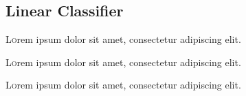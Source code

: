 \subsection{Linear Classifier}

\lettrine[nindent=0em,lines=3]{L} orem ipsum dolor sit amet, consectetur adipiscing elit.
\lipsum[2-3] %

\lettrine[nindent=0em,lines=3]{L} orem ipsum dolor sit amet, consectetur adipiscing elit.
\lipsum[2-3] %

\lettrine[nindent=0em,lines=3]{L} orem ipsum dolor sit amet, consectetur adipiscing elit.
\lipsum[2-3] %

